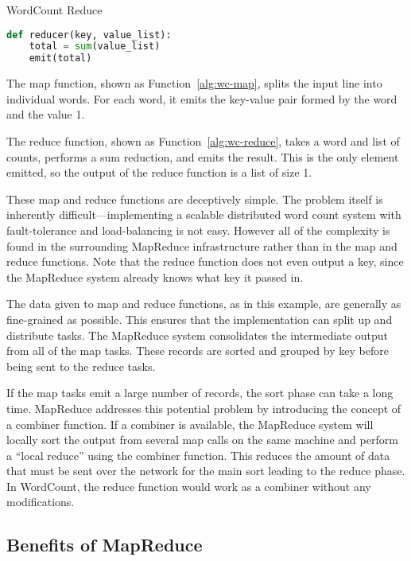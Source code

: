 \documentclass[letterpaper]{sig-alternate}
\begin{document}
\begin{algorithm}[tbp]
\caption{WordCount Reduce}
\label{alg:wc-reduce}
\begin{lstlisting}[language=Python]
def reducer(key, value_list):
    total = sum(value_list)
    emit(total)
\end{lstlisting}
\end{algorithm}

The map function, shown as Function~\ref{alg:wc-map}, splits the input line
into individual words.  For each word, it emits the key-value pair formed by
the word and the value 1.

The reduce function, shown as Function~\ref{alg:wc-reduce}, takes a word and
list of counts, performs a sum reduction, and emits the result.  This is the
only element emitted, so the output of the reduce function is a list of size
1.

These map and reduce functions are deceptively simple.  The problem itself is
inherently difficult---implementing a scalable distributed word count system
with fault-tolerance and load-balancing is not easy.  However all of the
complexity is found in the surrounding MapReduce infrastructure rather than in
the map and reduce functions.  Note that the reduce function does not even
output a key, since the MapReduce system already knows what key it passed in.

The data given to map and reduce functions, as in this example, are generally
as fine-grained as possible.  This ensures that the implementation can split
up and distribute tasks.  The MapReduce system consolidates the intermediate
output from all of the map tasks.  These records are sorted and grouped by
key before being sent to the reduce tasks.

If the map tasks emit a large number of records, the sort phase can take a
long time.  MapReduce addresses this potential problem by introducing the
concept of a combiner function.  If a combiner is available, the MapReduce
system will locally sort the output from several map calls on the same machine
and perform a ``local reduce'' using the combiner function.  This reduces the
amount of data that must be sent over the network for the main sort leading to
the reduce phase. In WordCount, the reduce function would work as a combiner
without any modifications.

\subsection{Benefits of MapReduce}
\end{document}
